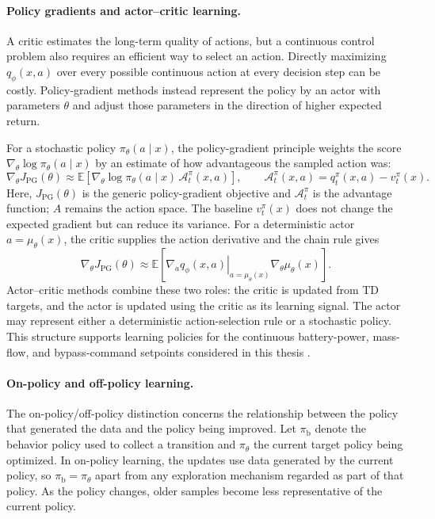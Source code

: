 \documentclass[12pt]{article}
\begin{document}
\paragraph{Policy gradients and actor--critic learning.}
A critic estimates the long-term quality of actions, but a continuous control problem also requires an efficient way to select an action. Directly maximizing $q_\phi(x,a)$ over every possible continuous action at every decision step can be costly. Policy-gradient methods instead represent the policy by an actor with parameters $\theta$ and adjust those parameters in the direction of higher expected return.

For a stochastic policy $\pi_\theta(a\mid x)$, the policy-gradient principle weights the score $\nabla_\theta\log\pi_\theta(a\mid x)$ by an estimate of how advantageous the sampled action was:
\[
\nabla_\theta J_{\mathrm{PG}}(\theta)
\approx
\mathbb{E}\!\left[
\nabla_\theta\log\pi_\theta(a\mid x)\,\mathcal{A}_t^\pi(x,a)
\right],
\qquad
\mathcal{A}_t^\pi(x,a)=q_t^\pi(x,a)-v_t^\pi(x).
\]
Here, $J_{\mathrm{PG}}(\theta)$ is the generic policy-gradient objective and $\mathcal{A}_t^\pi$ is the advantage function; $A$ remains the action space. The baseline $v_t^\pi(x)$ does not change the expected gradient but can reduce its variance. For a deterministic actor $a=\mu_\theta(x)$, the critic supplies the action derivative and the chain rule gives
\[
\nabla_\theta J_{\mathrm{PG}}(\theta)
\approx
\mathbb{E}\!\left[
\left.\nabla_a q_\phi(x,a)\right|_{a=\mu_\theta(x)}
\nabla_\theta\mu_\theta(x)
\right].
\]
Actor--critic methods combine these two roles: the critic is updated from TD targets, and the actor is updated using the critic as its learning signal. The actor may represent either a deterministic action-selection rule or a stochastic policy. This structure supports learning policies for the continuous battery-power, mass-flow, and bypass-command setpoints considered in this thesis \cite{sutton2018reinforcement}.

\paragraph{On-policy and off-policy learning.}
The on-policy/off-policy distinction concerns the relationship between the policy that generated the data and the policy being improved. Let $\pi_{\mathrm b}$ denote the behavior policy used to collect a transition and $\pi_\theta$ the current target policy being optimized. In on-policy learning, the updates use data generated by the current policy, so $\pi_{\mathrm b}=\pi_\theta$ apart from any exploration mechanism regarded as part of that policy. As the policy changes, older samples become less representative of the current policy.
\end{document}
